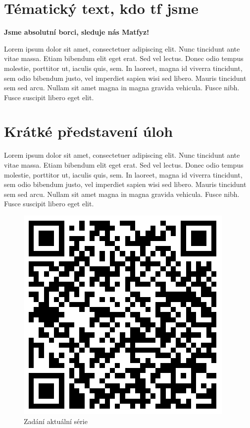 \documentclass{../../style/mkia5}
\begin{document}
\section*{Tématický text, kdo tf jsme}
\textbf{Jsme absolutní borci, sleduje nás Matfyz!}
\vspace{0.5cm}

Lorem ipsum dolor sit amet, consectetuer adipiscing elit. Nunc tincidunt ante vitae massa. Etiam bibendum elit eget erat. Sed vel lectus. Donec odio tempus molestie, porttitor ut, iaculis quis, sem. In laoreet, magna id viverra tincidunt, sem odio bibendum justo, vel imperdiet sapien wisi sed libero. Mauris tincidunt sem sed arcu. Nullam sit amet magna in magna gravida vehicula. Fusce nibh. Fusce suscipit libero eget elit.
\section*{Krátké představení úloh}
Lorem ipsum dolor sit amet, consectetuer adipiscing elit. Nunc tincidunt ante vitae massa. Etiam bibendum elit eget erat. Sed vel lectus. Donec odio tempus molestie, porttitor ut, iaculis quis, sem. In laoreet, magna id viverra tincidunt, sem odio bibendum justo, vel imperdiet sapien wisi sed libero. Mauris tincidunt sem sed arcu. Nullam sit amet magna in magna gravida vehicula. Fusce nibh. Fusce suscipit libero eget elit.
\vspace{0.5cm}
\begin{figure}[H]
\begin{center}
\includegraphics[scale=0.3]{../qrcodes/MKI1/batch1el.png}
\\
Zadání aktuální série
\end{center}
\end{figure}
\end{document}
